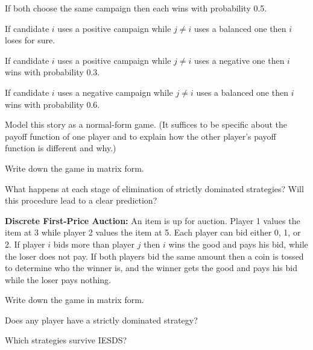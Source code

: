 If both choose the same campaign then each wins with probability 0.5.

If candidate $i$ uses a positive campaign while $j \neq i$ uses a balanced one then $i$ loses for
sure.

If candidate $i$ uses a positive campaign while $j \neq i$ uses a negative one then $i$ wins with
probability 0.3.

If candidate $i$ uses a negative campaign while $j \neq i$ uses a balanced one then $i$ wins with
probability 0.6.
\begin{partes}
\item Model this story as a normal-form game. (It suffices to be specific about the payoff function
of one player and to explain how the other player's payoff function is different and why.)
\item Write down the game in matrix form.
\item What happens at each stage of elimination of strictly dominated strategies? Will this
procedure lead to a clear prediction?
\end{partes}
\resolespaco


\textbf{Discrete First-Price Auction:} An item is up for auction. Player 1 values the item
at 3 while player 2 values the item at 5. Each player can bid either 0, 1, or 2. If player $i$ bids
more than player $j$ then $i$ wins the good and pays his bid, while the loser does not pay. If both
players bid the same amount then a coin is tossed to determine who the winner is, and the winner
gets the good and pays his bid while the loser pays nothing.
\begin{partes}
\item Write down the game in matrix form.
\item Does any player have a strictly dominated strategy?
\item Which strategies survive IESDS?
\end{partes}
\resolespaco


